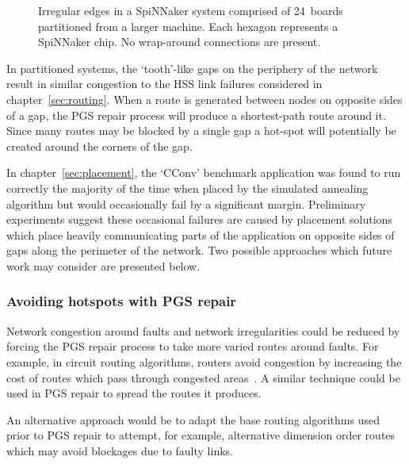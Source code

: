 			\begin{figure}
				\center
				
				\caption[Irregular edges of a partitioned SpiNNaker system.]%
				{Irregular edges in a SpiNNaker system comprised of 24~boards
				partitioned from a larger machine.  Each hexagon represents a SpiNNaker
				chip. No wrap-around connections are present.}
				\label{fig:spalloc-mesh}
			\end{figure}
			
			In partitioned systems, the `tooth'-like gaps on the periphery of the
			network result in similar congestion to the HSS link failures considered
			in chapter~\ref{sec:routing}. When a route is generated between nodes on
			opposite sides of a gap, the PGS repair process will produce a
			shortest-path route around it. Since many routes may be blocked by a
			single gap a hot-spot will potentially be created around the corners of
			the gap.
			
			In chapter~\ref{sec:placement}, the `CConv' benchmark application was
			found to run correctly the majority of the time when placed by the
			simulated annealing algorithm but would occasionally fail by a
			significant margin. Preliminary experiments suggest these occasional
			failures are caused by placement solutions which place heavily
			communicating parts of the application on opposite sides of gaps along
			the perimeter of the network. Two possible approaches which future work
			may consider are presented below.
			
			\subsubsection{Avoiding hotspots with PGS repair}
				
				\label{sec:pgs-repair-improvements}	
				
				Network congestion around faults and network irregularities could be
				reduced by forcing the PGS repair process to take more varied routes
				around faults. For example, in circuit routing algorithms, routers
				avoid congestion by increasing the cost of routes which pass through
				congested areas~\cite{kahng11}. A similar technique could be used in
				PGS repair to spread the routes it produces.
				
				An alternative approach would be to adapt the base routing algorithms
				used prior to PGS repair to attempt, for example, alternative dimension
				order routes which may avoid blockages due to faulty links.
			
